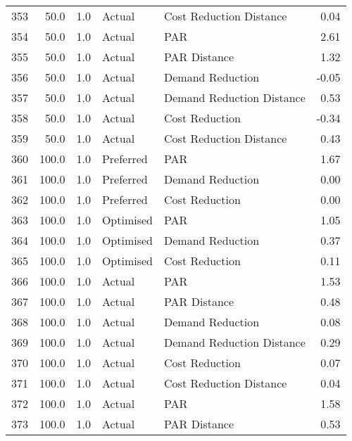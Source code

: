 \begin{longtable}{lrrllr}
353  &         50.0 &     1.0 &         Actual &    Cost Reduction Distance &   0.04 \\
354  &         50.0 &     1.0 &         Actual &                        PAR &   2.61 \\
355  &         50.0 &     1.0 &         Actual &               PAR Distance &   1.32 \\
356  &         50.0 &     1.0 &         Actual &           Demand Reduction &  -0.05 \\
357  &         50.0 &     1.0 &         Actual &  Demand Reduction Distance &   0.53 \\
358  &         50.0 &     1.0 &         Actual &             Cost Reduction &  -0.34 \\
359  &         50.0 &     1.0 &         Actual &    Cost Reduction Distance &   0.43 \\
360  &        100.0 &     1.0 &      Preferred &                        PAR &   1.67 \\
361  &        100.0 &     1.0 &      Preferred &           Demand Reduction &   0.00 \\
362  &        100.0 &     1.0 &      Preferred &             Cost Reduction &   0.00 \\
363  &        100.0 &     1.0 &      Optimised &                        PAR &   1.05 \\
364  &        100.0 &     1.0 &      Optimised &           Demand Reduction &   0.37 \\
365  &        100.0 &     1.0 &      Optimised &             Cost Reduction &   0.11 \\
366  &        100.0 &     1.0 &         Actual &                        PAR &   1.53 \\
367  &        100.0 &     1.0 &         Actual &               PAR Distance &   0.48 \\
368  &        100.0 &     1.0 &         Actual &           Demand Reduction &   0.08 \\
369  &        100.0 &     1.0 &         Actual &  Demand Reduction Distance &   0.29 \\
370  &        100.0 &     1.0 &         Actual &             Cost Reduction &   0.07 \\
371  &        100.0 &     1.0 &         Actual &    Cost Reduction Distance &   0.04 \\
372  &        100.0 &     1.0 &         Actual &                        PAR &   1.58 \\
373  &        100.0 &     1.0 &         Actual &               PAR Distance &   0.53 \\

\end{longtable}
